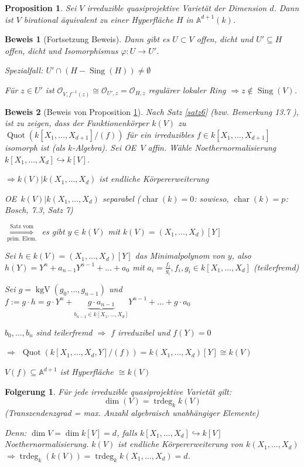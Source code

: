 \documentclass[a4paper, 12pt, numbers=noendperiod, chapterprefix=true, headsepline]{scrbook}
\theoremstyle{break}
\newtheorem{Prop}[Def]{Proposition}
\newtheorem{Folg}[Def]{Folgerung}
\theoremstyle{nonumberbreak}
\newtheorem{Bew}{Beweis}
\theoremstyle{nonumberplain}
\DeclareMathOperator{\Quot}{Quot}
\DeclareMathOperator{\Sing}{Sing}
\DeclareMathOperator{\chara}{char}
\DeclareMathOperator{\kgv}{kgV}
\DeclareMathOperator{\trdeg}{trdeg}
\newcommand{\A}{\mathbb{A}}
\newcommand{\calO}{\mathcal{O}}
\renewcommand{\OE}{O\!\!E~}
\begin{document}
\begin{Prop}\label{19.8}
Sei $V$ irreduzible quasiprojektive Variet\"at der Dimension $d$. Dann ist $V$ birational \"aquivalent zu einer Hyperfl\"ache $H$ in $\A^{d+1}(k)$.
\end{Prop}

\begin{Bew}[Fortsetzung Beweis]
Dann gibt es $U \subset V$ offen, dicht und $U'\subseteq H$ offen, dicht und Isomorphismus $\varphi:U\to U'$.

\emph{Spezialfall}: $U'\cap(H-\Sing(H))\ne \emptyset$

F\"ur $z\in U'$ ist $\calO_{V,f^{-1}(z)}\cong \calO_{U',z}=\calO_{H,z}$ regul\"arer lokaler Ring $\Rightarrow z\notin\Sing(V)$.
\end{Bew}

\begin{Bew}[Beweis von Proposition \ref{19.8}]
Nach Satz \ref{satz6} (bzw. Bemerkung 13.7 ), ist zu zeigen, dass der Funktionenk\"orper $k(V)$ zu $\Quot(k[X_1,\ldots ,X_{d+1}]/(f))$ f\"ur ein irreduzibles $f\in k[X_1,\ldots ,X_{d+1}]$ isomorph ist (als $k$-Algebra). Sei \OE $V$ affin. W\"ahle Noethernormalisierung $k[X_1,\ldots ,X_d]\hookrightarrow k[V]$.

$\Rightarrow k(V)|k(X_1,\ldots ,X_d)$ ist endliche K\"orpererweiterung

\OE $k(V)|k(X_1,\ldots ,X_d)$ separabel ($\chara(k)=0$: sowieso, $\chara(k)=p$: Bosch, 7.3, Satz 7)

$\overset{\text{Satz vom}}{\underset{\text{prim. Elem.}}{\Longrightarrow}}$ es gibt $y\in k(V)$ mit $k(V)=(X_1,\ldots ,X_d)[Y]$

Sei $h\in k(V)=(X_1,\ldots ,X_d)[Y]$ das Minimalpolynom von $y$, also $h(Y)=Y^n+a_{n-1}Y^{n-1}+\ldots +a_0$ mit $a_i=\frac{f_i}{g_i}, f_i, g_i \in k[X_1,\ldots ,X_d]$ (teilerfremd)

Sei $g=\kgv(g_0,\ldots ,g_{n-1})$ und $f:=g\cdot h= g\cdot Y^n+\underbrace{g\cdot a_{n-1}}_{b_{n-1}\in k[X_1,\ldots ,X_d]}Y^{n-1}+\ldots +g\cdot a_0$

$b_0,\ldots ,b_n$ sind teilerfremd $\Rightarrow$ $f$ irreduzibel und $f(Y)=0$

$\Rightarrow$ $\Quot(k[X_1,\ldots ,X_d,Y]/(f))=k(X_1,\ldots ,X_d)[Y]\cong k(V)$

$V(f)\subseteq\A^{d+1}$ ist Hyperfl\"ache $\cong k(V)$
\end{Bew}

\begin{Folg}
F\"ur jede irreduzible quasiprojektive Variet\"at gilt:
\[\dim(V)=\trdeg_kk(V)\]
(Transzendenzgrad = max. Anzahl algebraisch unabh\"angiger Elemente)

\emph{Denn:} $\dim V=\dim k[V]=d$, falls $k[X_1,\ldots ,X_d]\hookrightarrow k[V]$ Noethernormalisierung. $k(V)$ ist endliche K\"orpererweiterung von $k(X_1,\ldots ,X_d)$ $\Rightarrow \trdeg_k(k(V))=\trdeg_kk(X_1,\ldots ,X_d)=d$.
\end{Folg}
\end{document}
